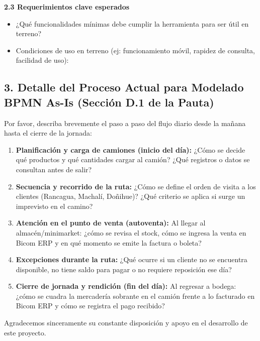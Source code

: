 \documentclass[10pt,a4paper]{article}
\begin{document}
\textbf{2.3 Requerimientos clave esperados}

\begin{itemize}[leftmargin=1.2cm]
    \item ¿Qué funcionalidades mínimas debe cumplir la herramienta para ser útil en terreno? \underline{\hspace{7cm}}
    \item Condiciones de uso en terreno (ej: funcionamiento móvil, rapidez de consulta, facilidad de uso): \underline{\hspace{7cm}}
\end{itemize}

\subsection*{3. Detalle del Proceso Actual para Modelado BPMN As-Is (Sección D.1 de la Pauta)}

Por favor, describa brevemente el paso a paso del flujo diario desde la mañana hasta el cierre de la jornada:

\begin{enumerate}[leftmargin=1.5cm, itemsep=0.6em]
    \item \textbf{Planificación y carga de camiones (inicio del día):} ¿Cómo se decide qué productos y qué cantidades cargar al camión? ¿Qué registros o datos se consultan antes de salir? \underline{\hspace{6cm}}
    \item \textbf{Secuencia y recorrido de la ruta:} ¿Cómo se define el orden de visita a los clientes (Rancagua, Machalí, Doñihue)? ¿Qué criterio se aplica si surge un imprevisto en el camino? \underline{\hspace{6cm}}
    \item \textbf{Atención en el punto de venta (autoventa):} Al llegar al almacén/minimarket: ¿cómo se revisa el stock, cómo se ingresa la venta en Bicom ERP y en qué momento se emite la factura o boleta? \underline{\hspace{6cm}}
    \item \textbf{Excepciones durante la ruta:} ¿Qué ocurre si un cliente no se encuentra disponible, no tiene saldo para pagar o no requiere reposición ese día? \underline{\hspace{6cm}}
    \item \textbf{Cierre de jornada y rendición (fin del día):} Al regresar a bodega: ¿cómo se cuadra la mercadería sobrante en el camión frente a lo facturado en Bicom ERP y cómo se registra el pago recibido? \underline{\hspace{6cm}}
\end{enumerate}

Agradecemos sinceramente su constante disposición y apoyo en el desarrollo de este proyecto.

\end{document}
